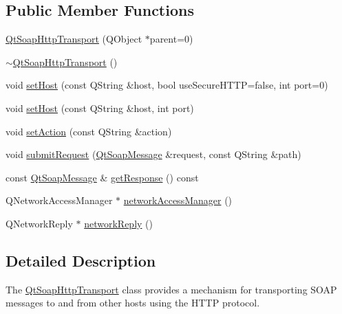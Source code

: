 \subsection*{Public Member Functions}
\begin{DoxyCompactItemize}
\item 
\mbox{\hyperlink{class_qt_soap_http_transport_a74fc050fd6d7914dfe444af3faf16334}{Qt\+Soap\+Http\+Transport}} (Q\+Object $\ast$parent=0)
\item 
\mbox{\hyperlink{class_qt_soap_http_transport_a1884800f50975eabf79f5ef2b4c2dc03}{$\sim$\+Qt\+Soap\+Http\+Transport}} ()
\item 
void \mbox{\hyperlink{class_qt_soap_http_transport_a7dfb69fe0e076407cda0093ee99c4988}{set\+Host}} (const Q\+String \&host, bool use\+Secure\+H\+T\+TP=false, int port=0)
\item 
void \mbox{\hyperlink{class_qt_soap_http_transport_afb8d7fa9d30b5ec0dc2857818c5c1b0a}{set\+Host}} (const Q\+String \&host, int port)
\item 
void \mbox{\hyperlink{class_qt_soap_http_transport_af370cf7ff31756ebdc2bb48b2ecb3663}{set\+Action}} (const Q\+String \&action)
\item 
void \mbox{\hyperlink{class_qt_soap_http_transport_a6b49c608e9eb6af98b7258c8a59c5005}{submit\+Request}} (\mbox{\hyperlink{class_qt_soap_message}{Qt\+Soap\+Message}} \&request, const Q\+String \&path)
\item 
const \mbox{\hyperlink{class_qt_soap_message}{Qt\+Soap\+Message}} \& \mbox{\hyperlink{class_qt_soap_http_transport_a85f606ff295d200c387e85a710692c59}{get\+Response}} () const
\item 
Q\+Network\+Access\+Manager $\ast$ \mbox{\hyperlink{class_qt_soap_http_transport_af3c8834f62181744fb6089cd50e1b184}{network\+Access\+Manager}} ()
\item 
Q\+Network\+Reply $\ast$ \mbox{\hyperlink{class_qt_soap_http_transport_a2cf74b91f101f37583e4013ee812ed20}{network\+Reply}} ()
\end{DoxyCompactItemize}


\subsection{Detailed Description}
The \mbox{\hyperlink{class_qt_soap_http_transport}{Qt\+Soap\+Http\+Transport}} class provides a mechanism for transporting S\+O\+AP messages to and from other hosts using the H\+T\+TP protocol. 

